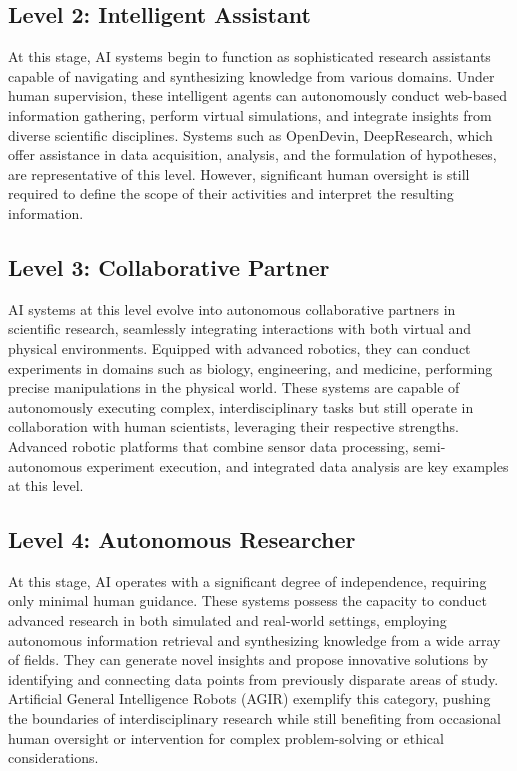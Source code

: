 \subsection*{Level 2: Intelligent Assistant}

At this stage, AI systems begin to function as sophisticated research assistants capable of navigating and synthesizing knowledge from various domains. Under human supervision, these intelligent agents can autonomously conduct web-based information gathering, perform virtual simulations, and integrate insights from diverse scientific disciplines. Systems such as OpenDevin, DeepResearch, which offer assistance in data acquisition, analysis, and the formulation of hypotheses, are representative of this level. However, significant human oversight is still required to define the scope of their activities and interpret the resulting information.

\subsection*{Level 3: Collaborative Partner}

AI systems at this level evolve into autonomous collaborative partners in scientific research, seamlessly integrating interactions with both virtual and physical environments. Equipped with advanced robotics, they can conduct experiments in domains such as biology, engineering, and medicine, performing precise manipulations in the physical world. These systems are capable of autonomously executing complex, interdisciplinary tasks but still operate in collaboration with human scientists, leveraging their respective strengths. Advanced robotic platforms that combine sensor data processing, semi-autonomous experiment execution, and integrated data analysis are key examples at this level.

\subsection*{Level 4: Autonomous Researcher}

At this stage, AI operates with a significant degree of independence, requiring only minimal human guidance. These systems possess the capacity to conduct advanced research in both simulated and real-world settings, employing autonomous information retrieval and synthesizing knowledge from a wide array of fields. They can generate novel insights and propose innovative solutions by identifying and connecting data points from previously disparate areas of study. Artificial General Intelligence Robots (AGIR) exemplify this category, pushing the boundaries of interdisciplinary research while still benefiting from occasional human oversight or intervention for complex problem-solving or ethical considerations.

